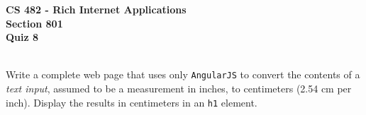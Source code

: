 \documentclass[letterpaper]{exam}
\begin{document}
\begin{center}
	\textbf{CS 482 - Rich Internet Applications} \\
	\textbf{Section 801} \\
	\textbf{Quiz 8} \\
	\vspace{5mm}
	 \\
\end{center}


\begin{questions}
	\question[10] Write a complete web page that uses only \texttt{AngularJS} to convert the contents of a \emph{text input}, assumed to be a measurement in inches, to centimeters (2.54 cm per inch). Display the results in centimeters in an \texttt{h1} element.
\end{questions}
\end{document}
